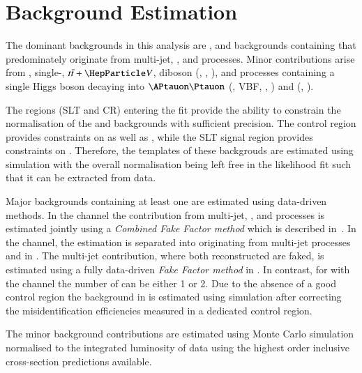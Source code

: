 \section{Background Estimation}

The dominant backgrounds in this analysis are \ttbar, \Zjets{} and backgrounds containing \faketauhad that
predominately originate from multi-jet, \Wjets, and \ttbar
processes. Minor contributions arise from \Wjets, single-\Ptop,
$\ttbar+\PVB$, diboson (\WW, \WZ, \ZZ), and processes containing a
single Higgs boson decaying into $\APtauon\Ptauon$ (\ggF, VBF, \VH,
\ttH) and \bbbar (\VH, \ttH).

The regions (SLT and \ZHF CR) entering the fit provide the ability to
constrain the normalisation of the \ttbar and \ZHF backgrounds with
sufficient precision. The \ZHF control region provides constraints on
\ZHF as well as \ttbar, while the \lephad SLT signal region provides
constraints on \ttbar. Therefore, the templates of these backgrouds
are estimated using simulation with the overall normalisation being
left free in the likelihood fit such that it can be extracted from
data.

Major backgrounds containing at least one \faketauhad are estimated
using data-driven methods. In the \lephad channel the contribution
\faketauhad from multi-jet, \Wjets, and \ttbar processes is estimated
jointly using a \textit{Combined Fake Factor method} which is
described in~. In the \hadhad
channel, the estimation is separated into \faketauhad originating from
multi-jet processes and \faketauhad in \ttbar. The multi-jet
contribution, where both reconstructed \tauhadvis are faked, is
estimated using a fully data-driven \textit{Fake Factor method} in
. In contrast, for \ttbar with \faketauhad the
\hadhad channel the number of \faketauhad can be either 1 or 2. Due to
the absence of a good \ttbar control region the \faketauhad background
in \ttbar is estimated using simulation after correcting the
misidentification efficiencies measured in a dedicated control region.

The minor background contributions are estimated using Monte Carlo
simulation normalised to the integrated luminosity of data using the
highest order inclusive cross-section predictions available.



